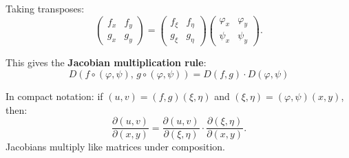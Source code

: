 \documentclass[11pt]{report}
\begin{document}
Taking transposes:
\[
\begin{pmatrix} f_x & f_y \\ g_x & g_y \end{pmatrix} = \begin{pmatrix} f_\xi & f_\eta \\ g_\xi & g_\eta \end{pmatrix} \begin{pmatrix} \varphi_x & \varphi_y \\ \psi_x & \psi_y \end{pmatrix}.
\]

This gives the \textbf{Jacobian multiplication rule}:
\[
\boxed{D(f \circ (\varphi, \psi), \, g \circ (\varphi, \psi)) = D(f, g) \cdot D(\varphi, \psi)}
\]

\begin{remark}
In compact notation: if $(u, v) = (f, g)(\xi, \eta)$ and $(\xi, \eta) = (\varphi, \psi)(x, y)$, then:
\[
\frac{\partial(u, v)}{\partial(x, y)} = \frac{\partial(u, v)}{\partial(\xi, \eta)} \cdot \frac{\partial(\xi, \eta)}{\partial(x, y)}.
\]
Jacobians multiply like matrices under composition.
\end{remark}
\end{document}

